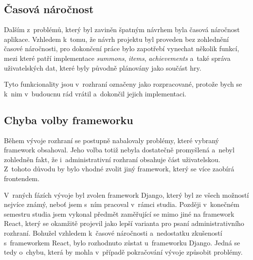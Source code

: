 \subsection*{Časová náročnost}
\label{subsec:implementation-problems-time}
Dalším z~problémů, který byl zaviněn špatným návrhem byla časová náročnost aplikace. Vzhledem k~tomu, že návrh projektu byl proveden bez zohlednění časové náročnosti, pro dokončení práce bylo zapotřebí vynechat několik funkcí, mezi které patří implementace \textit{summons}, \textit{items}, \textit{achievements} a~také správa uživatelských dat, které byly původně plánovány jako součást hry.

Tyto funkcionality jsou v~rozhraní označeny jako rozpracované, protože bych se k~nim v~budoucnu rád vrátil a~dokončil jejich implementaci.

\subsection*{Chyba volby frameworku}
\label{subsec:implementation-problems-framework}
Během vývoje rozhraní se postupně nabalovaly problémy, které vybraný framework obsahoval. Jeho volba totiž nebyla dostatečně promyšlená a~nebyl zohledněn fakt, že i~administrativní rozhraní obsahuje část uživatelskou. Z~tohoto důvodu by bylo vhodné zvolit jiný framework, který se více zaobírá frontendem.

V~raných fázích vývoje byl zvolen framework Django, který byl ze všech možností nejvíce známý, neboť jsem s~ním pracoval v~rámci studia. Později v~konečném semestru studia jsem vykonal předmět zaměřující se mimo jiné na framework React, který se okamžitě projevil jako lepší varianta pro psaní administrativního rozhraní. Bohužel vzhledem k~časové náročnosti a~nedostatku zkušeností s~frameworkem React, bylo rozhodnuto zůstat u~frameworku Django. Jedná se tedy o~chybu, která by mohla v~případě pokračování vývoje způsobit problémy.

\endinput